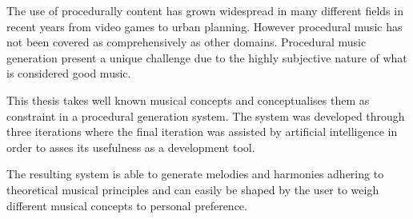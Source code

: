 The use of procedurally content has grown widespread in many different fields in recent years from video games to urban planning. However procedural music has not been covered as comprehensively as other domains. Procedural music generation present a unique challenge due to the highly subjective nature of what is considered good music.

This thesis takes well known musical concepts and conceptualises them as constraint in a procedural generation system. The system was developed through three iterations where the final iteration was assisted by artificial intelligence in order to asses its usefulness as a development tool.

The resulting system is able to generate melodies and harmonies adhering to theoretical musical principles and can easily be shaped by the user to weigh different musical concepts to personal preference.
